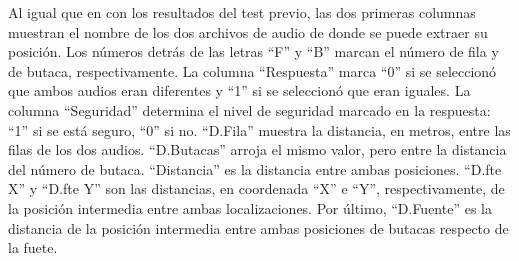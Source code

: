 \documentclass[11pt,a4paper,twoside]{book}
\begin{document}
\normalsize
Al igual que en con los resultados del test previo, las dos primeras columnas muestran el nombre de los dos archivos de audio de donde se puede extraer su posición. Los números detrás de las letras ``F'' y ``B'' marcan el número de fila y de butaca, respectivamente. La columna ``Respuesta'' marca ``0'' si se seleccionó que ambos audios eran diferentes y ``1'' si se seleccionó que eran iguales. La columna ``Seguridad'' determina el nivel de seguridad marcado en la respuesta: ``1'' si se está seguro, ``0'' si no. ``D.Fila'' muestra la distancia, en metros, entre las filas de los dos audios. ``D.Butacas'' arroja el mismo valor, pero entre la distancia del número de butaca. ``Distancia'' es la distancia entre ambas posiciones. ``D.fte X'' y ``D.fte Y'' son las distancias, en coordenada ``X'' e ``Y'', respectivamente,  de la posición intermedia entre ambas localizaciones. Por último, ``D.Fuente'' es la distancia de la posición intermedia entre ambas posiciones de butacas respecto de la fuete.
\end{document}
